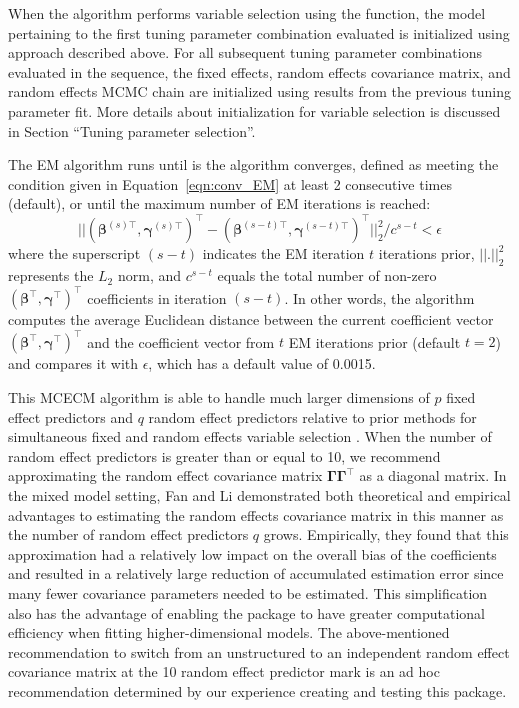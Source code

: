 When the algorithm performs variable selection using the  function, the model pertaining to the first tuning parameter combination evaluated is initialized using approach described above. For all subsequent tuning parameter combinations evaluated in the sequence, the fixed effects, random effects covariance matrix, and random effects MCMC chain are initialized using results from the previous tuning parameter fit. More details about initialization for variable selection is discussed in Section ``Tuning parameter selection''.

The EM algorithm runs until is the algorithm converges, defined as meeting the condition given in Equation~\ref{eqn:conv_EM} at least 2 consecutive times (default), or until the maximum number of EM iterations is reached:
\begin{equation}
    ||(\boldsymbol\beta^{(s)\top}, \boldsymbol\gamma^{(s)\top})^\top - (\boldsymbol\beta^{(s-t)\top}, \boldsymbol\gamma^{(s-t)\top})^\top||_2^2 / c^{s-t} < \epsilon
    \label{eqn:conv_EM}
  \end{equation}
where the superscript $(s-t)$ indicates the EM iteration $t$ iterations prior, $||.||_2^2$ represents the $L_2$ norm, and $c^{s-t}$ equals the total number of non-zero $(\boldsymbol \beta^\top, \boldsymbol \gamma^\top)^\top$ coefficients in iteration $(s-t)$. In other words, the algorithm computes the average Euclidean distance between the current coefficient vector $(\boldsymbol \beta^\top, \boldsymbol \gamma^\top)^\top$ and the coefficient vector from $t$ EM iterations prior (default $t=2$) and compares it with $\epsilon$, which has a default value of 0.0015.

This MCECM algorithm is able to handle much larger dimensions of $p$ fixed effect predictors and $q$ random effect predictors relative to prior methods for simultaneous fixed and random effects variable selection \citep{bondell2010joint,BICq2011}.  When the number of random effect predictors is greater than or equal to 10, we recommend approximating the random effect covariance
matrix \(\boldsymbol{\Gamma \Gamma}^\top\) as a diagonal matrix. In the mixed model setting, Fan and Li \citeyearpar{fanli2012} demonstrated both theoretical and empirical advantages to estimating the random effects covariance matrix in this manner as the number of random effect predictors $q$ grows. Empirically, they found that this approximation had a relatively low impact on the overall bias of the coefficients and resulted in a relatively large reduction of accumulated estimation error since many fewer covariance parameters needed to be estimated. This simplification also has the advantage of enabling the package to have greater computational efficiency when fitting higher-dimensional models. The above-mentioned recommendation to switch from an unstructured to an independent random effect covariance matrix at the 10 random effect predictor mark is an ad hoc recommendation determined by our experience creating and testing this package.

